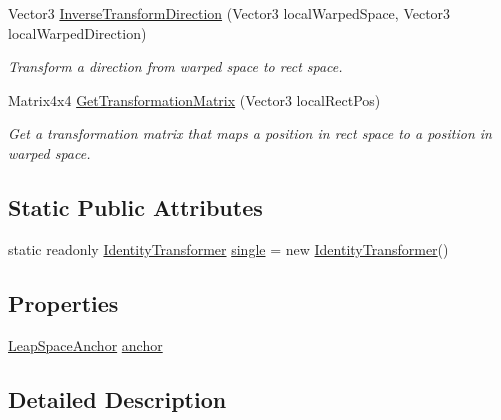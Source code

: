 \begin{DoxyCompactItemize}
Vector3 \mbox{\hyperlink{class_leap_1_1_unity_1_1_space_1_1_identity_transformer_a793967a882ba3156bf728ca4ad8afd26}{Inverse\+Transform\+Direction}} (Vector3 local\+Warped\+Space, Vector3 local\+Warped\+Direction)
\begin{DoxyCompactList}\small\item\em Transform a direction from warped space to rect space. \end{DoxyCompactList}\item 
Matrix4x4 \mbox{\hyperlink{class_leap_1_1_unity_1_1_space_1_1_identity_transformer_a693ed0cac442e346b6bad9e1a5dc92a1}{Get\+Transformation\+Matrix}} (Vector3 local\+Rect\+Pos)
\begin{DoxyCompactList}\small\item\em Get a transformation matrix that maps a position in rect space to a position in warped space. \end{DoxyCompactList}\end{DoxyCompactItemize}
\subsection*{Static Public Attributes}
\begin{DoxyCompactItemize}
\item 
static readonly \mbox{\hyperlink{class_leap_1_1_unity_1_1_space_1_1_identity_transformer}{Identity\+Transformer}} \mbox{\hyperlink{class_leap_1_1_unity_1_1_space_1_1_identity_transformer_a3ec1330730787111258ed33bb4050886}{single}} = new \mbox{\hyperlink{class_leap_1_1_unity_1_1_space_1_1_identity_transformer}{Identity\+Transformer}}()
\end{DoxyCompactItemize}
\subsection*{Properties}
\begin{DoxyCompactItemize}
\item 
\mbox{\hyperlink{class_leap_1_1_unity_1_1_space_1_1_leap_space_anchor}{Leap\+Space\+Anchor}} \mbox{\hyperlink{class_leap_1_1_unity_1_1_space_1_1_identity_transformer_a262c6ce350ad3ce0aa9090f0360508fe}{anchor}}
\end{DoxyCompactItemize}


\subsection{Detailed Description}


